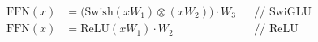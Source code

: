 \begin{align*}
    \text{FFN}(x) &= \big( \text{Swish}(xW_1) \otimes (xW_2) \big){\cdot}W_3 &&\scriptstyle\text{// SwiGLU} \\
    \text{FFN}(x) &= \text{ReLU}(xW_1){\cdot}W_2 &&\scriptstyle\text{// ReLU}
\end{align*}